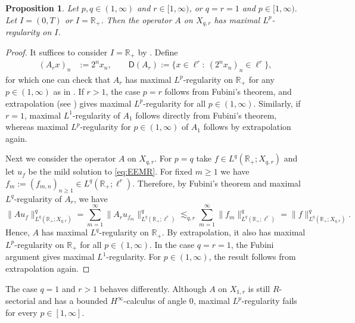 \documentclass{amsart}
\let\geq\geqslant
\theoremstyle{plain}
\theoremstyle{remark}
\theoremstyle{plain}
\newtheorem{proposition}[theorem]{Proposition}
\numberwithin{equation}{section}
\newcommand{\R}{\mathbb R}
\newcommand{\1}{\mathbf 1}
\newcommand{\Dom}{\mathsf{D}}
\begin{document}
\begin{proposition}\label{prop:MRqr}
Let $p,q \in (1, \infty)$ and $r\in [1, \infty)$, or $q=r=1$ and $p\in [1, \infty)$. Let $I= (0,T)$ or $I = \R_+$. Then the operator $A$ on $X_{q,r}$ has maximal $L^p$-regularity on $I$.
\end{proposition}
\begin{proof}
It suffices to consider $I = \R_+$ by \cite[Section 17.2.e]{HNVW3}. Define
\begin{align*}
        (A_rx)_{n}&:=2^n x_{n},\qquad \Dom(A_r):=\{x\in \ell^r:\ (2^n x_{n})_{n}\in \ell^r\},
\end{align*}
for which one can check that $A_r$ has maximal $L^p$-regularity on $\R_+$ for any $p\in (1, \infty)$ as in \cite[Example 17.4.7]{HNVW3}. If $r>1$, the case $p=r$ follows from Fubini's theorem, and extrapolation (see \cite[Theorem 17.2.31]{HNVW3}) gives maximal $L^p$-regularity for all
$p\in(1,\infty)$. Similarly, if $r=1$, maximal $L^1$-regularity  of $A_1$ follows directly from Fubini's theorem, whereas maximal $L^p$-regularity for $p\in(1,\infty)$ of $A_1$ follows by extrapolation again.

Next we consider the operator $A$ on $X_{q,r}$. For $p=q$  take $f \in L^q(\R_+;X_{q,r})$ and let $u_f$ be the mild solution to \eqref{eq:EEMR}. For fixed $m\geq 1$ we have $f_m:=(f_{m,n})_{n\geq 1} \in L^q(\R_+;\ell^r)$. Therefore, by Fubini's theorem and maximal $L^q$-regularity of $A_r$, we have
\[\|A u_f\|_{L^q(\R_+;X_{q,r})}^q = \sum_{m=1}^\infty \|A_r u_{f_m}\|_{L^q(\R_+;\ell^r)}^q \lesssim_{q,r} \sum_{m= 1}^\infty\|f_m\|_{L^q(\R_+;\ell^r)}^q = \|f\|_{L^q(\R_+;X_{q,r})}^q.\]
Hence, $A$ has maximal $L^q$-regularity on $\R_+$. By extrapolation, it also has maximal $L^p$-regularity on $\R_+$ for all $p\in (1, \infty)$. In the case $q=r=1$, the Fubini argument gives maximal
$L^1$-regularity. For $p\in(1,\infty)$, the result follows from extrapolation again.
\end{proof}

The case $q=1$ and $r>1$ behaves differently. Although $A$ on
$X_{1,r}$ is still $R$-sectorial and has a bounded
$H^\infty$-calculus of angle $0$, maximal $L^p$-regularity fails for
every $p\in[1,\infty]$.
\end{document}

